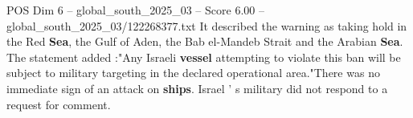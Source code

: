 \begin{textsample}{POS Dim 6 – global\_south\_2025\_03 – Score 6.00 – global\_south\_2025\_03/122268377.txt}
It described the warning as taking hold in the Red \textbf{Sea}, the Gulf of Aden, the Bab el-Mandeb Strait and the Arabian \textbf{Sea}.
The statement added :"Any Israeli \textbf{vessel} attempting to violate this ban will be subject to military targeting in the declared operational area."There was no immediate sign of an attack on \textbf{ships}.
Israel ' s military did not respond to a request for comment.

\end{textsample}
